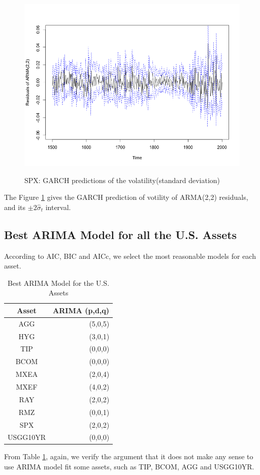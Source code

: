 \documentclass[12pt]{article}
\begin{document}
\begin{figure}
  \caption{SPX: GARCH predictions of the volatility(standard deviation)}
  \includegraphics[width = \textwidth]{../results/SPX_GARCH_predresid}
  \label{fig:SPX_GARCH_predresid}
\end{figure}
The Figure \ref{fig:SPX_GARCH_predresid} gives the GARCH prediction of votility of ARMA(2,2) residuals, and its $\pm 2\hat{\sigma}_t$ interval.

\subsection{Best ARIMA Model for all the U.S. Assets }
According to AIC, BIC and AICc, we select the most reasonable models for each asset.
\begin{table}[!h]
\caption{Best ARIMA Model for the U.S. Assets }
\centering 
\begin{tabular}{ | c || r | } 
 \hline
Asset & ARIMA (p,d,q) \\
  \hline \hline
AGG & (5,0,5) \\ 
HYG & (3,0,1) \\ 
TIP &  (0,0,0)\\ 
BCOM & (0,0,0)\\ 
MXEA & (2,0,4) \\ 
MXEF & (4,0,2)\\ 
RAY &  (2,0,2)\\ 
RMZ & (0,0,1) \\ 
SPX & (2,0,2) \\ 
USGG10YR & (0,0,0) \\
 \hline
\end{tabular}
\label{table:BestArima}
\end{table}
From Table \ref{table:BestArima}, again, we verify the argument that it does not make any sense to use ARIMA model fit some assets, such as TIP, BCOM, AGG and USGG10YR.
\end{document}
